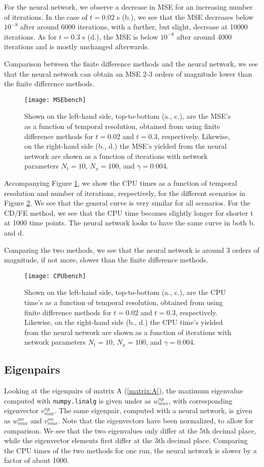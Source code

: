 For the neural network, we observe a decrease in MSE for an increasing number of iterations. In the case of $t=0.02$ s (b.), we see that the MSE decreases below $10^{-8}$ after around 6000 iterations, with a further, but slight, decrease at 10000 iterations. As for $t=0.3$ s (d.), the MSE is below $10^{-8}$ after around 4000 iterations and is mostly unchanged afterwards.

Comparison between the finite difference methods and the neural network, we see that the neural network can obtain an MSE 2-3 orders of magnitude lower than the finite difference methods.
\begin{figure}[htbp]
 	\centering
 	\texttt{[image: MSEbench]}
  \caption{Shown on the left-hand side, top-to-bottom (a., c.), are the MSE's as a function of temporal resolution, obtained from using finite difference methods for $t=0.02$ and $t=0.3$, respectively. Likewise, on the right-hand side (b., d.) the MSE's yielded from the neural network are shown as a function of iterations with network parameters $N_t = 10$, $N_x = 100$, and $\gamma = 0.004$.}
  \label{fig:MSEbench}
\end{figure}

Accompanying Figure \ref{fig:MSEbench}, we show the CPU times as a function of temporal resolution and number of iterations, respectively, for the different scenarios in Figure \ref{fig:CPUbench}. We see that the general curve is very similar for all scenarios. For the CD/FE method, we see that the CPU time becomes slightly longer for shorter t at 1000 time points. The neural network looks to have the same curve in both b. and d.

Comparing the two methods, we see that the neural network is around 3 orders of magnitude, if not more, slower than the finite difference methods.
\begin{figure}[htbp]
 	\centering
 	\texttt{[image: CPUbench]}
 	\caption{Shown on the left-hand side, top-to-bottom (a., c.), are the CPU time's as a function of temporal resolution, obtained from using finite difference methods for $t=0.02$ and $t=0.3$, respectively. Likewise, on the right-hand side (b., d.) the CPU time's yielded from the neural network are shown as a function of iterations with network parameters $N_t = 10$, $N_x = 100$, and $\gamma = 0.004$.}
  \label{fig:CPUbench}
\end{figure}


\subsection{Eigenpairs}
Looking at the eigenpairs of matrix A (\ref{matrix:A}), the maximum eigenvalue computed with  \texttt{numpy.linalg} is given under as $w_{max}^{np}$, with corresponding eigenvector $v_{max}^{np}$. The same eigenpair, computed with a neural network, is given as $w_{max}^{nn}$ and $v_{max}^{nn}$. Note that the eigenvectors have been normalized, to allow for comparison. We see that the two eigenvalues only differ at the 5th decimal place, while the eigenvector elements first differ at the 3th decimal place. Comparing the CPU times of the two methods for one run, the neural network is slower by a factor of about 1000.  

